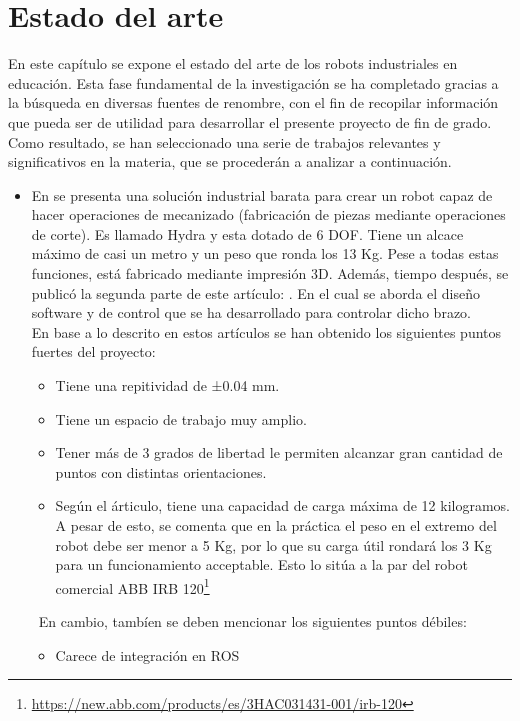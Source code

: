 \chapter{Estado del arte}
\label{cap:capitulo2}
En este capítulo se expone el estado del arte de los robots industriales en educación. Esta fase fundamental de la 
investigación se ha completado gracias a la búsqueda en diversas fuentes de renombre, con el fin de 
recopilar información que pueda ser de utilidad para desarrollar el presente proyecto de fin de grado. Como resultado, se 
han seleccionado una serie de trabajos relevantes y significativos en la materia, que se procederán a analizar a continuación.
\begin{itemize}
    \item En \cite{KRIMPENIS2020103} se presenta una solución industrial barata para crear un robot capaz de hacer operaciones de mecanizado (fabricación 
    de piezas mediante operaciones de corte). Es llamado Hydra y esta dotado de 6 \ac{DOF}. Tiene un alcace máximo de casi un metro y un 
    peso que ronda los 13 Kg. Pese a todas estas funciones, está fabricado mediante impresión 3D. 
    Además, tiempo después, se publicó la segunda parte de este artículo: \cite{PAPAPASCHOS2020109}. En el cual se aborda el diseño software y de control 
    que se ha desarrollado para controlar dicho brazo. \\
    En base a lo descrito en estos artículos se han obtenido los siguientes puntos fuertes del proyecto:
    \begin{itemize}
        \item Tiene una repitividad de ±0.04 mm.
        \item Tiene un espacio de trabajo muy amplio.
        \item Tener más de 3 grados de libertad le permiten alcanzar gran cantidad de puntos con distintas orientaciones.
        \item Según el árticulo, tiene una capacidad de carga máxima de 12 kilogramos. A pesar de esto, se comenta que en la práctica el peso en el 
        extremo del robot debe ser menor a 5 Kg, por lo que su carga útil rondará los 3 Kg para un funcionamiento acceptable. Esto lo sitúa a la par 
        del robot comercial ABB IRB 120\footnote{\url{https://new.abb.com/products/es/3HAC031431-001/irb-120}}  
    \end{itemize}\
    En cambio, tambíen se deben mencionar los siguientes puntos débiles:
    \begin{itemize}
        \item Carece de integración en ROS

\end{itemize}
\end{itemize}
